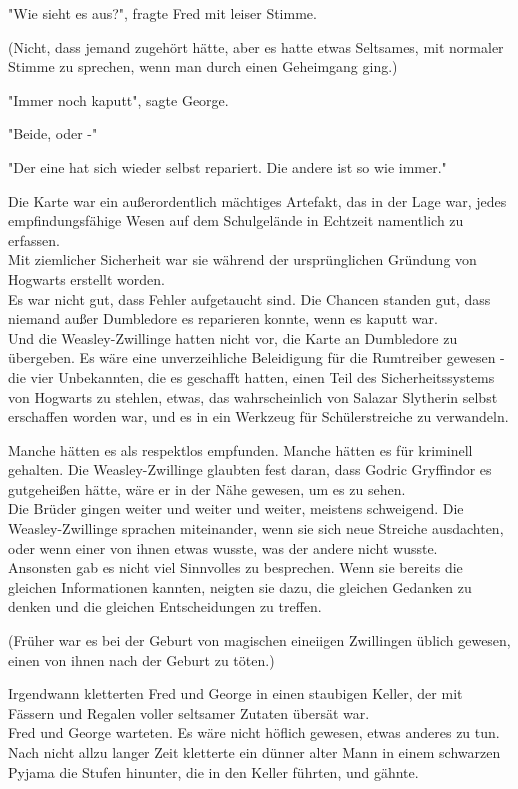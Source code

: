 {"Wie sieht es aus?", fragte Fred mit leiser Stimme.

(Nicht, dass jemand zugehört hätte, aber es hatte etwas Seltsames, mit normaler Stimme zu sprechen, wenn man durch einen Geheimgang ging.)

"Immer noch kaputt", sagte George.

"Beide, oder -"

"Der eine hat sich wieder selbst repariert. Die andere ist so wie immer."

Die Karte war ein außerordentlich mächtiges Artefakt, das in der Lage war, jedes empfindungsfähige Wesen auf dem Schulgelände in Echtzeit namentlich zu erfassen.\\ Mit ziemlicher Sicherheit war sie während der ursprünglichen Gründung von Hogwarts erstellt worden.\\ Es war nicht gut, dass Fehler aufgetaucht sind. Die Chancen standen gut, dass niemand außer Dumbledore es reparieren konnte, wenn es kaputt war.\\ Und die Weasley-Zwillinge hatten nicht vor, die Karte an Dumbledore zu übergeben. Es wäre eine unverzeihliche Beleidigung für die Rumtreiber gewesen - die vier Unbekannten, die es geschafft hatten, einen Teil des Sicherheitssystems von Hogwarts zu stehlen, etwas, das wahrscheinlich von Salazar Slytherin selbst erschaffen worden war, und es in ein Werkzeug für Schülerstreiche zu verwandeln.

Manche hätten es als respektlos empfunden. Manche hätten es für kriminell gehalten. Die Weasley-Zwillinge glaubten fest daran, dass Godric Gryffindor es gutgeheißen hätte, wäre er in der Nähe gewesen, um es zu sehen.\\ Die Brüder gingen weiter und weiter und weiter, meistens schweigend. Die Weasley-Zwillinge sprachen miteinander, wenn sie sich neue Streiche ausdachten, oder wenn einer von ihnen etwas wusste, was der andere nicht wusste.\\ Ansonsten gab es nicht viel Sinnvolles zu besprechen. Wenn sie bereits die gleichen Informationen kannten, neigten sie dazu, die gleichen Gedanken zu denken und die gleichen Entscheidungen zu treffen.

(Früher war es bei der Geburt von magischen eineiigen Zwillingen üblich gewesen, einen von ihnen nach der Geburt zu töten.)

Irgendwann kletterten Fred und George in einen staubigen Keller, der mit Fässern und Regalen voller seltsamer Zutaten übersät war.\\ Fred und George warteten. Es wäre nicht höflich gewesen, etwas anderes zu tun. Nach nicht allzu langer Zeit kletterte ein dünner alter Mann in einem schwarzen Pyjama die Stufen hinunter, die in den Keller führten, und gähnte.

}
